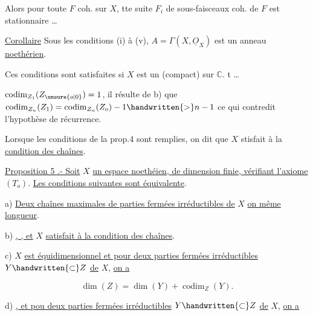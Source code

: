 Alors pour toute  $F$ coh. sur $X$,  tte suite  $F_i$ de sous-faisceaux coh. de $F$ est stationnaire \ldots

\uline{Corollaire} Sous les conditions (i) à (v), $A=\Gamma(X,\underline O_X)$ est un anneau \uline{noethérien}.

Ces conditions sont satisfaites si $X$ est un   (compact)  sur $\mathbb C$.  t  \ldots

$\operatorname{codim}_{Z_1}(Z_{\unsure{o|0}})=1$, il résulte de b) que $\operatorname{codim}_{Z_n}(Z_1)=\operatorname{codim}_{Z_n}(Z_o)-1\handwritten{>}n-1$ ce qui contredit l'hypothèse de récurrence.

Lorsque les conditions de la prop.4 sont remplies, on dit que $X$ stisfait à la \uline{condition des chaînes}.

\uline{Proposition 5 .- Soit} $X$ \uline{un espace noethéien, de dimension finie, vérifiant l'axiome} $(T_o)$. \uline{Les conditions suivantes sont équivalente}.

a) \uline{Deux chaînes maximales de parties fermées irréductibles de} $X$ \uline{on même longueur}.

b) \uline{ , , et} $X$ \uline{satisfait à la condition des chaînes}.

c)  $X$ \uline{est équidimensionnel et pour deux parties fermées irréductibles} $Y\handwritten{\subset}Z$ \uline{de} $X$, \uline{on a}

\[
 \dim(Z)=\dim(Y)+\operatorname{codim}_Z(Y).\tag*{(4)}
\]

d)  \uline{, et pou deux parties fermées irréductibles} $Y\handwritten{\subset}Z$ \uline{de} $X$, \uline{on a}

